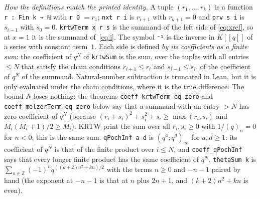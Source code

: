 \documentclass[11pt]{amsart}
\theoremstyle{definition}
\numberwithin{equation}{section}
\newcommand{\Z}{\mathbb{Z}}
\begin{document}
\emph{How the definitions match the printed identity.} A tuple $(r_1,\dots,r_k)$ is a function
\lstinline{r : Fin k → ℕ} with \texttt{r 0} $=r_1$; \texttt{nxt r i} is $r_{i+1}$ with $r_{k+1}=0$ and
\texttt{prv s i} is $s_{i-1}$ with $s_0=0$. \texttt{krtwTerm x r s} is the summand of the left side of
\eqref{eq:xref}, so at $x=1$ it is the summand of~\eqref{eq:i}. The symbol \lstinline{⁻¹} is the inverse in
$K[[q]]$ of a series with constant term~$1$. Each side is defined \emph{by its coefficients as a finite
sum}: the coefficient of $q^N$ of \texttt{krtwSum} is the sum, over the tuples with all entries $\le N$
that satisfy the chain conditions $r_{i+1}\le r_i$ and $s_{i-1}\le s_i$, of the coefficient of $q^N$ of
the summand. Natural-number subtraction is truncated in Lean, but it is only evaluated under the chain
conditions, where it is the true difference. The bound $N$ loses nothing: the theorems
\texttt{coeff\_krtwTerm\_eq\_zero} and \texttt{coeff\_melzerTerm\_eq\_zero} below say that a summand
with an entry $>N$ has zero coefficient of $q^N$ (because $(r_i+s_i)^2+s_i^2+s_i\ge\max(r_i,s_i)$ and
$M_i(M_i+1)/2\ge M_i$). KRTW print the sum over all $r_i,s_i\ge0$ with $1/(q)_n=0$ for $n<0$; this is the
same sum. \texttt{qPochInf a d} is $(q^a;q^d)_\infty$ for $a,d\ge1$: its coefficient of $q^N$ is that of the
finite product over $i\le N$, and \texttt{coeff\_qPochInf} says that every longer finite product has the
same coefficient of $q^N$. \texttt{thetaSum k} is $\sum_{n\in\Z}(-1)^nq^{((k+2)n^2+kn)/2}$ with the terms
$n\ge0$ and $-n-1$ paired by hand (the exponent at $-n-1$ is that at $n$ plus $2n+1$, and
$(k+2)n^2+kn$ is even).
\end{document}

